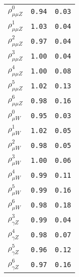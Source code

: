 \begin{table}
\begin{tabular}{lcc}
$\rho_{\mu\mu Z}^{0}$ & {\tt 0.94} & {\tt 0.03}\\
$\rho_{\mu\mu Z}^{1}$ & {\tt 1.03} & {\tt 0.04}\\
$\rho_{\mu\mu Z}^{2}$ & {\tt 0.97} & {\tt 0.04}\\
$\rho_{\mu\mu Z}^{3}$ & {\tt 1.00} & {\tt 0.04}\\
$\rho_{\mu\mu Z}^{4}$ & {\tt 1.00} & {\tt 0.08}\\
$\rho_{\mu\mu Z}^{5}$ & {\tt 1.02} & {\tt 0.13}\\
$\rho_{\mu\mu Z}^{6}$ & {\tt 0.98} & {\tt 0.16}\\
$\rho_{\mu W}^{0}$ & {\tt 0.95} & {\tt 0.03}\\
$\rho_{\mu W}^{1}$ & {\tt 1.02} & {\tt 0.05}\\
$\rho_{\mu W}^{2}$ & {\tt 0.98} & {\tt 0.05}\\
$\rho_{\mu W}^{3}$ & {\tt 1.00} & {\tt 0.06}\\
$\rho_{\mu W}^{4}$ & {\tt 0.99} & {\tt 0.11}\\
$\rho_{\mu W}^{5}$ & {\tt 0.99} & {\tt 0.16}\\
$\rho_{\mu W}^{6}$ & {\tt 0.98} & {\tt 0.18}\\
$\rho_{\gamma Z}^{3}$ & {\tt 0.99} & {\tt 0.04}\\
$\rho_{\gamma Z}^{4}$ & {\tt 0.98} & {\tt 0.07}\\
$\rho_{\gamma Z}^{5}$ & {\tt 0.96} & {\tt 0.12}\\
$\rho_{\gamma Z}^{6}$ & {\tt 0.97} & {\tt 0.16}\\
\hline
\end{tabular}
\end{table}

